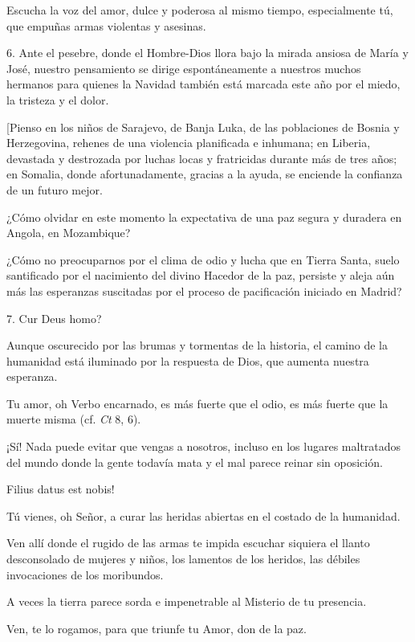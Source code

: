 \begin{body}
					Escucha la voz del amor, dulce y poderosa al mismo tiempo, especialmente tú, que empuñas armas violentas y asesinas.
					
					6. Ante el pesebre, donde el Hombre-Dios llora bajo la mirada ansiosa de María y José, nuestro pensamiento se dirige espontáneamente a nuestros muchos hermanos para quienes la Navidad también está marcada este año por el miedo, la tristeza y el dolor.
					
					{[}Pienso en los niños de Sarajevo, de Banja Luka, de las poblaciones de Bosnia y Herzegovina, rehenes de una violencia planificada e inhumana; en Liberia, devastada y destrozada por luchas locas y fratricidas durante más de tres años; en Somalia, donde afortunadamente, gracias a la ayuda, se enciende la confianza de un futuro mejor.
					
					¿Cómo olvidar en este momento la expectativa de una paz segura y duradera en Angola, en Mozambique?
					
					¿Cómo no preocuparnos por el clima de odio y lucha que en Tierra Santa, suelo santificado por el nacimiento del divino Hacedor de la paz, persiste y aleja aún más las esperanzas suscitadas por el proceso de pacificación iniciado en Madrid?
					
					7. Cur Deus homo?
					
					Aunque oscurecido por las brumas y tormentas de la historia, el camino de la humanidad está iluminado por la respuesta de Dios, que aumenta nuestra esperanza.
					
					Tu amor, oh Verbo encarnado, es más fuerte que el odio, es más fuerte que la muerte misma (cf. \emph{Ct} 8, 6).
					
					¡Sí! Nada puede evitar que vengas a nosotros, incluso en los lugares maltratados del mundo donde la gente todavía mata y el mal parece reinar sin oposición.
					
					Filius datus est nobis!
					
					Tú vienes, oh Señor, a curar las heridas abiertas en el costado de la humanidad.
					
					Ven allí donde el rugido de las armas te impida escuchar siquiera el llanto desconsolado de mujeres y niños, los lamentos de los heridos, las débiles invocaciones de los moribundos.
					
					A veces la tierra parece sorda e impenetrable al Misterio de tu presencia.
					
					Ven, te lo rogamos, para que triunfe tu Amor, don de la paz.
					

\end{body}

